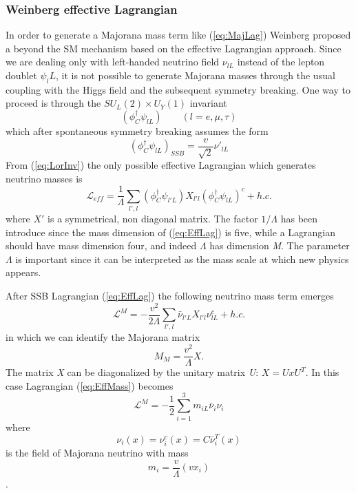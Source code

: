 \documentclass{subnucbo}
\begin{document}
\subsubsection{Weinberg effective Lagrangian}
In order to generate a Majorana mass term like (\ref{eq:MajLag}) Weinberg proposed a beyond the SM mechanism based on the effective Lagrangian approach.
Since we are dealing only with left-handed neutrino field $\nu_{lL}$ instead of the lepton doublet $\psi_lL$, it is not possible to generate Majorana masses through the usual coupling with the Higgs field and the subsequent symmetry breaking. 
One way to proceed is through the $SU_L(2)\times U_Y(1)$ invariant
\begin{equation}
\label{eq:LorInv}
(\phi_C^{\dagger}\psi_{lL})\qquad(l=e, \mu, \tau)
\end{equation}
which after spontaneous symmetry breaking assumes the form
\begin{equation}
(\phi_C^{\dagger}\psi_{lL})_{SSB}=\frac{v}{\sqrt{2}}\nu'_{lL}
\end{equation}
From (\ref{eq:LorInv}) the only possible effective Lagrangian which generates neutrino masses is
\begin{equation}
\label{eq:EffLag}
\mathcal{L}_{eff}=\frac{1}{\Lambda}\sum_{l',l}(\phi_C^{\dagger}\psi_{l'L})X_{l'l}(\phi_C^{\dagger}\psi_{lL})^c+h.c.
\end{equation}
where $X'$ is a symmetrical, non diagonal matrix.
The factor $1/\Lambda$ has been introduce since the mass dimension of (\ref{eq:EffLag}) is five, while a Lagrangian should have mass dimension four, and indeed $\Lambda$ has dimension \emph{M}.
The parameter $\Lambda$ is important since it can be interpreted as the mass scale at which new physics appears.

After SSB Lagrangian (\ref{eq:EffLag}) the following neutrino mass term emerges
\begin{equation}
\label{eq:EffMass}
\mathcal{L}^M=-\frac{v^2}{2\Lambda}\sum_{l',l}\bar{\nu}_{l'L}X_{l'l}\nu_{lL}^c+h.c.
\end{equation}
in which we can identify the Majorana matrix
\begin{equation}
M_M=\frac{v^2}{\Lambda}X. 
\end{equation}
The matrix \emph{X} can be diagonalized by the unitary matrix \emph{U}: $X=UxU^T$.
In this case Lagrangian (\ref{eq:EffMass}) becomes
\begin{equation}
\mathcal{L}^M=-\frac{1}{2}\sum_{i=1}^3m_{iL}\bar{\nu}_i\nu_i
\end{equation}
where
\begin{equation}
\label{eq:nuC}
\nu_i(x)=\nu_i^c(x)=C\bar{\nu}_i^T(x)
\end{equation}
is the field of  Majorana neutrino with mass 
\begin{equation}
\label{eq:neutMass}
m_{i}=\frac{v}{\Lambda}(vx_i)
\end{equation}.
\end{document}
